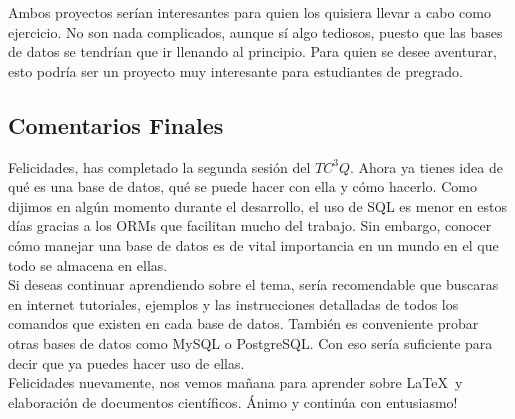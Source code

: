 \documentclass[10pt,letterpaper]{article}
\begin{document}
Ambos proyectos ser\'ian interesantes para quien los quisiera llevar a cabo como ejercicio. No son nada complicados, aunque s\'i algo tediosos, puesto que las bases de datos se tendr\'ian que ir llenando al principio. Para quien se desee aventurar, esto podr\'ia ser un proyecto muy interesante para estudiantes de pregrado.

\subsection{Comentarios Finales}
Felicidades, has completado la segunda sesi\'on del $TC^3 Q$. Ahora ya tienes idea de qu\'e es una base de datos, qu\'e se puede hacer con ella y c\'omo hacerlo. Como dijimos en alg\'un momento durante el desarrollo, el uso de SQL es menor en estos d\'ias gracias a los ORMs que facilitan mucho del trabajo. Sin embargo, conocer c\'omo manejar una base de datos es de vital importancia en un mundo en el que todo se almacena en ellas.\\

Si deseas continuar aprendiendo sobre el tema, ser\'ia recomendable que buscaras en internet tutoriales, ejemplos y las instrucciones detalladas de todos los comandos que existen en cada base de datos. Tambi\'en es conveniente probar otras bases de datos como MySQL o PostgreSQL. Con eso ser\'ia suficiente para decir que ya puedes hacer uso de ellas.\\

Felicidades nuevamente, nos vemos ma\~nana para aprender sobre \LaTeX\ y elaboraci\'on de documentos cient\'ificos. \'Animo y contin\'ua con entusiasmo!
\end{document}

